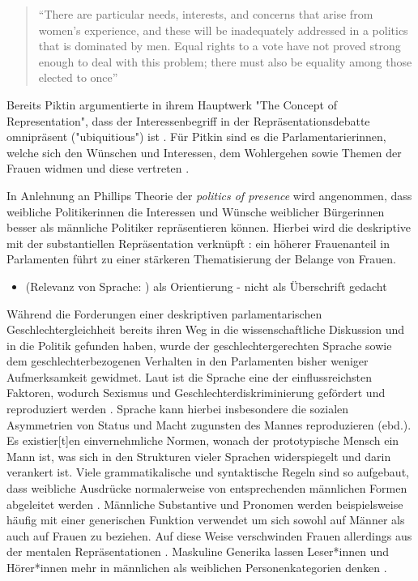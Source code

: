 \documentclass[12pt, 
    twoside=false, 
    bibliography=totoc, 
    numbers=endperiod, 
    headings=normal, 
    toc=chapterentrydotfill
    ]{scrbook}
\begin{document}
\begin{quote}
    \enquote{There are particular needs, interests, and concerns that arise from women's experience, and these will be inadequately addressed in a politics that is dominated by men. Equal rights to a vote have not proved strong enough to deal with this problem; there must also be equality among those elected to once} \parencite[66]{phillips_1998}
\end{quote}

Bereits Piktin \parencite*{pitkin_1972} argumentierte in ihrem Hauptwerk "The Concept of Representation", dass der Interessenbegriff in der Repräsentationsdebatte omnipräsent ("ubiquitious") ist \parencite[69]{wangnerud_2000}. Für Pitkin sind es die Parlamentarierinnen, welche sich den Wünschen und Interessen, dem Wohlergehen sowie Themen der Frauen widmen und diese vertreten \parencites[vgl.][413]{blaxill_2016}{pitkin_1972}. 

In Anlehnung an Phillips Theorie der \emph{politics of presence} \parencite*{phillips_1998} wird angenommen, dass weibliche Politikerinnen die Interessen und Wünsche weiblicher Bürgerinnen besser als männliche Politiker repräsentieren können. Hierbei wird die deskriptive mit der substantiellen Repräsentation verknüpft \parencite[52]{wangnerud_2009} : ein höherer Frauenanteil in Parlamenten führt zu einer stärkeren Thematisierung der Belange von Frauen.

\begin{itemize}
\item (Relevanz von Sprache: ) als Orientierung - nicht als Überschrift gedacht
\end{itemize}

Während die Forderungen einer deskriptiven parlamentarischen Geschlechtergleichheit bereits ihren Weg in die wissenschaftliche Diskussion und in die Politik gefunden haben, wurde der geschlechtergerechten Sprache sowie dem geschlechterbezogenen Verhalten in den Parlamenten bisher weniger Aufmerksamkeit gewidmet. 
Laut \textcite{menegatti_2017} ist die Sprache eine der einflussreichsten Faktoren, wodurch Sexismus und Geschlechterdiskriminierung gefördert und reproduziert werden \parencite*[1]{menegatti_2017}. Sprache kann hierbei insbesondere die sozialen Asymmetrien von Status und Macht zugunsten des Mannes reproduzieren (ebd.). Es existier[t]en einvernehmliche Normen, wonach der prototypische Mensch ein Mann ist, was sich in den Strukturen vieler Sprachen widerspiegelt und darin verankert ist. Viele grammatikalische und syntaktische Regeln sind so aufgebaut, dass weibliche Ausdrücke normalerweise von entsprechenden männlichen Formen abgeleitet werden \parencite*[1]{menegatti_2017}. Männliche Substantive und Pronomen werden beispielsweise häufig mit einer generischen Funktion verwendet um sich sowohl auf Männer als auch auf Frauen zu beziehen. Auf diese Weise verschwinden Frauen allerdings aus der mentalen Repräsentationen \parencites{vaughan_2018}{stahlberg_2001}. Maskuline Generika lassen Leser*innen und Hörer*innen mehr in männlichen als weiblichen Personenkategorien denken \parencites[2]{sczesny_2016}{stahlberg_2007}.
\end{document}
